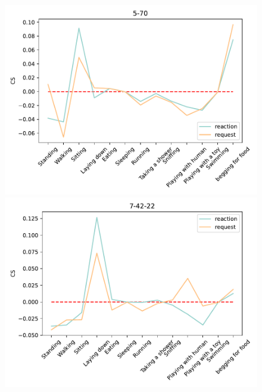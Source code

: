 \begin{figure}[ht]
	\centering
		\begin{minipage}[b]{.3\linewidth}
			\centering
			\includegraphics[width=0.99\linewidth]{./35word/5-70.pdf}
		\end{minipage}
		\begin{minipage}[b]{.3\linewidth}
			\centering
			\includegraphics[width=0.99\linewidth]{./35word/7-42-22.pdf}
		\end{minipage}
		\begin{minipage}[b]{.3\linewidth}
			\centering

\end{minipage}
\end{figure}
